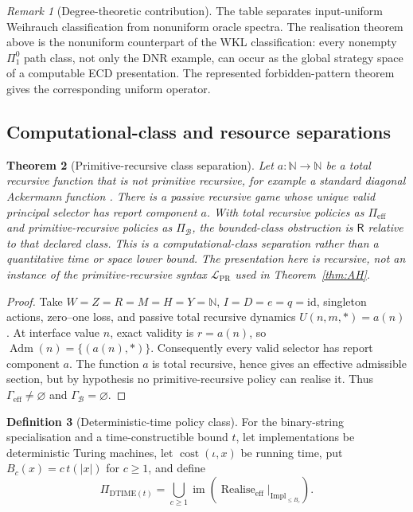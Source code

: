 \documentclass[11pt]{article}
\theoremstyle{plain}
\newtheorem{theorem}{Theorem}[section]
\theoremstyle{definition}
\newtheorem{definition}[theorem]{Definition}
\theoremstyle{remark}
\newtheorem{remark}[theorem]{Remark}
\newcommand{\N}{\mathbb{N}}
\newcommand{\im}{\operatorname{im}}
\newcommand{\Adm}{\operatorname{Adm}}
\newcommand{\realise}{\operatorname{Realise}}
\begin{document}
\begin{remark}[Degree-theoretic contribution]
The table separates input-uniform Weihrauch classification from nonuniform oracle
spectra. The realisation theorem above is the nonuniform counterpart of the WKL
classification: every nonempty $\Pi^0_1$ path class, not only the DNR example,
can occur as the global strategy space of a computable ECD presentation. The
represented forbidden-pattern theorem gives the corresponding uniform operator.
\end{remark}


\subsection{Computational-class and resource separations}

\begin{theorem}[Primitive-recursive class separation]\label{thm:primitive-class-separation}
Let $a:\N\to\N$ be a total recursive function that is not primitive recursive,
for example a standard diagonal Ackermann function \cite{rogers}. There is a
passive recursive
game whose unique valid principal selector has report component $a$. With total recursive policies as
$\Pi_{\mathrm{eff}}$ and primitive-recursive policies as $\Pi_{\mathcal B}$,
the bounded-class obstruction is $\mathsf R$ relative to that declared class.
This is a computational-class separation rather than a quantitative time or
space lower bound. The presentation here is recursive, not an instance of the
primitive-recursive syntax $\mathcal L_{\mathrm{PR}}$ used in
Theorem~\ref{thm:AH}.
\end{theorem}

\begin{proof}
Take $W=Z=R=M=H=Y=\N$, $I=D=e=q=\mathrm{id}$, singleton actions, zero--one
loss, and passive total recursive dynamics
$U(n,m,\ast)=a(n)$. At interface value $n$, exact validity is
$r=a(n)$, so $\Adm(n)=\{(a(n),\ast)\}$. Consequently every valid selector has
report component $a$. The function $a$ is total recursive, hence gives an
effective admissible section, but by hypothesis no primitive-recursive policy
can realise it. Thus $\Gamma_{\mathrm{eff}}\ne\varnothing$ and
$\Gamma_{\mathcal B}=\varnothing$.
\end{proof}

\begin{definition}[Deterministic-time policy class]\label{def:dtime-class}
For the binary-string specialisation and a time-constructible bound $t$, let
implementations be deterministic Turing machines, let
$\operatorname{cost}(\iota,x)$ be running time, put
$B_c(x)=c\,t(|x|)$ for $c\ge1$, and define
\[
\Pi_{\mathrm{DTIME}(t)}
=\bigcup_{c\ge1}
\im\!\left(
\realise_{\mathrm{eff}}|_{\mathrm{Impl}_{\le B_c}}
\right).
\]
\end{definition}
\end{document}
